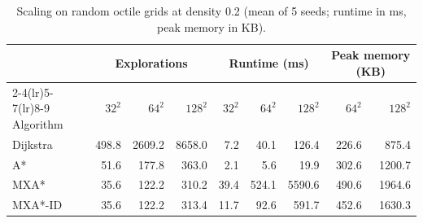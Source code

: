 \begin{table}[t]
\centering
\caption{Scaling on random octile grids at density 0.2 (mean of 5 seeds; runtime in ms, peak memory in KB).}
\label{tab:scaling}
\small
\begin{tabular}{lrrrrrrrr}
\toprule
& \multicolumn{3}{c}{Explorations} & \multicolumn{3}{c}{Runtime (ms)} & \multicolumn{2}{c}{Peak memory (KB)} \\
\cmidrule(lr){2-4}\cmidrule(lr){5-7}\cmidrule(lr){8-9}
Algorithm & $32^2$ & $64^2$ & $128^2$ & $32^2$ & $64^2$ & $128^2$ & $64^2$ & $128^2$ \\
\midrule
Dijkstra & 498.8 & 2609.2 & 8658.0 & 7.2 & 40.1 & 126.4 & 226.6 & 875.4 \\
A* & 51.6 & 177.8 & 363.0 & 2.1 & 5.6 & 19.9 & 302.6 & 1200.7 \\
MXA* & 35.6 & 122.2 & 310.2 & 39.4 & 524.1 & 5590.6 & 490.6 & 1964.6 \\
MXA*-ID & 35.6 & 122.2 & 313.4 & 11.7 & 92.6 & 591.7 & 452.6 & 1630.3 \\
\bottomrule
\end{tabular}
\end{table}
